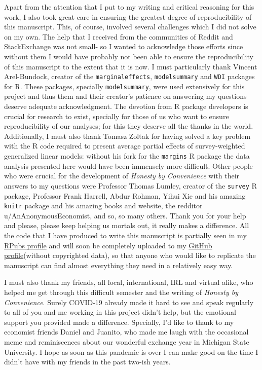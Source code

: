 \documentclass[12pt,a4]{article}\usepackage[]{graphicx}\usepackage[]{xcolor}
\begin{document}
Apart from the attention that I put to my writing and critical reasoning for this work, I also took great care in ensuring the greatest degree of reproducibility of this manuscript. This, of course, involved several challenges which I did not solve on my own. The help that I received from the communities of Reddit and StackExchange was not small- so I wanted to acknowledge those efforts since without them I would have probably not been able to ensure the reproducibility of this manuscript to the extent that it is now. I must particularly thank Vincent Arel-Bundock, creator of the \texttt{marginaleffects}, \texttt{modelsummary} and \texttt{WDI} packages for R. These packages, specially \texttt{modelsummary}, were used extensively for this project and thus them and their creator's patience on answering my questions deserve adequate acknowledgment. The devotion from R package developers is crucial for research to exist, specially for those of us who want to ensure reproducibility of our analyses; for this they deserve all the thanks in the world. Additionally, I must also thank Tomasz Zoltak for having solved a key problem with the R code required to present average partial effects of survey-weighted generalized linear models: without his fork for the \texttt{margins} R package the data analysis presented here would have been immensely more difficult. Other people who were crucial for the development of \textit{Honesty by Convenience} with their answers to my questions were Professor Thomas Lumley, creator of the \texttt{survey} R package, Professor Frank Harrell, Abdur Rohman, Yihui Xie and his amazing \texttt{knitr} package and his amazing books and website, the redditor u/AnAnonymousEconomist, and so, so many others. Thank you for your help and please, please keep helping us mortals out, it really makes a difference. All the code that I have produced to write this manuscript is partially seen in my \href{https://rpubs.com/dsanchezp998}{RPubs profile} and will soon be completely uploaded to my \href{https://github.com/dsanchezp18}{GitHub profile}(without copyrighted data), so that anyone who would like to replicate the manuscript can find almost everything they need in a relatively easy way. 

I must also thank my friends, all local, international, IRL and virtual alike, who helped me get through this difficult semester and the writing of \textit{Honesty by Convenience}.  Surely COVID-19 already made it hard to see and speak regularly to all of you and me working in this project didn't help, but the emotional support you provided made a difference. Specially, I'd like to thank to my economist friends Daniel and Juanito, who made me laugh with the occasional meme and reminiscences about our wonderful exchange year in Michigan State University. I hope as soon as this pandemic is over I can make good on the time I didn't have with my friends in the past two-ish years. 
\end{document}
